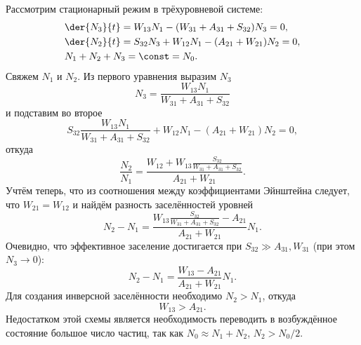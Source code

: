 Рассмотрим стационарный режим в трёхуровневой системе:
\begin{align*}
    & \der{N_3}{t} = W_{13}N_1 - (W_{31} + A_{31} + S_{32}) N_3 = 0,\\
    & \der{N_2}{t} = S_{32}N_3 + W_{12}N_1 - (A_{21} + W_{21}) N_2 = 0,\\
    & N_1 + N_2 + N_3 = \const = N_0.
\end{align*}
Свяжем \( N_1 \) и \( N_2 \). Из первого уравнения выразим \( N_3 \)
\[
    N_3 = \frac{W_{13}N_1}{W_{31} + A_{31} + S_{32}}
\]
и подставим во второе
\[
    S_{32}\frac{W_{13}N_1}{W_{31} + A_{31} + S_{32}} + W_{12}N_1 -
    (A_{21} + W_{21}) N_2 = 0,
\]
откуда
\[
    \frac{N_2}{N_1} =
        \frac{W_{12} + W_{13}\frac{S_{32}}{W_{31} + A_{31} + S_{32}}}
        {A_{21} + W_{21}}.
\]
Учтём теперь, что из соотношения между коэффициентами Эйнштейна следует, что
\( W_{21} = W_{12} \) и найдём разность заселённостей уровней
\[
    N_2 - N_1 = 
        \frac{W_{13}\frac{S_{32}}{W_{31} + A_{31} + S_{32}} - A_{21}}
        {A_{21} + W_{21}}N_1.
\]
Очевидно, что эффективное заселение достигается при
\( S_{32} \gg A_{31}, W_{31} \) (при этом \( N_3 \to 0 \)):
\[
    N_2 - N_1 = 
        \frac{W_{13} - A_{21}}{A_{21} + W_{21}}N_1.
\]
Для создания инверсной заселённости необходимо \( N_2 > N_1 \), откуда
\[
    W_{13} > A_{21}.
\]
Недостатком этой схемы является необходимость переводить в возбуждённое
состояние большое число частиц, так как \( N_0 \approx N_1 + N_2 \),
\( N_2 > N_0/2 \).

